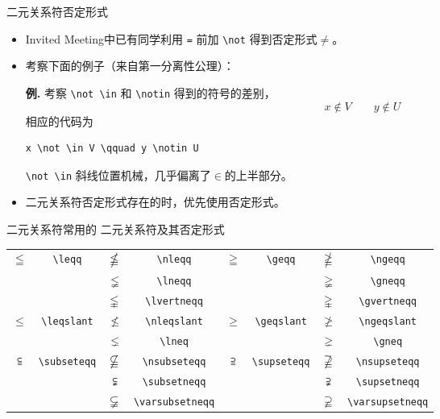 \documentclass[mathserif]{beamer}
\newcommand{\codegreen}[1]{\textcolor{codegreen}{#1}}
\newenvironment{instance}{\zihao{-5}\textbf{\songti \codegreen{例.}}}{\hfill\par}
\begin{document}
\begin{frame}[fragile]{二元关系符}{否定形式}
\begin{itemize}

\item Invited Meeting中已有同学利用 \lstinline'=' 前加 \lstinline'\not' 得到否定形式$\not =$。

\item 考察下面的例子（来自第一分离性公理）：

\begin{instance}
	考察 \lstinline'\not \in' 和 \lstinline'\notin' 得到的符号的差别，
\begin{equation*}
	x \not \in V \qquad y \notin U
\end{equation*}
相应的代码为
\begin{lstlisting}[numbers=none]
x \not \in V \qquad y \notin U
\end{lstlisting}
\lstinline'\not \in' 斜线位置机械，几乎偏离了$\in$的上半部分。
\end{instance}

\item 二元关系符否定形式存在的时，优先使用否定形式。

\end{itemize}
\end{frame}

\begin{frame}[fragile]{二元关系符}{常用的 \AmS{} 二元关系符及其否定形式}
\begin{table}[H]
\centering
\begin{tabular}{cc|cc|cc|cc}
	\toprule
	$\leqq$ & \lstinline'\leqq' & $\nleqq$ & \lstinline'\nleqq' & $\geqq$ & \lstinline'\geqq' & $\ngeqq$ & \lstinline'\ngeqq' \\
	~ & ~ & $\lneqq$ & \lstinline'\lneqq' & ~ & ~ & $\gneqq$ & \lstinline'\gneqq' \\
	~ & ~ & $\lvertneqq$ & \lstinline'\lvertneqq' & ~ & ~ & $\gvertneqq$ & \lstinline'\gvertneqq' \\
	$\leqslant$ & \lstinline'\leqslant' & $\nleqslant$ & \lstinline'\nleqslant' & $\geqslant$ & \lstinline'\geqslant' & $\ngeqslant$ & \lstinline'\ngeqslant' \\
	~ & ~ & $\lneq$ & \lstinline'\lneq' & ~ & ~ & $\gneq$ & \lstinline'\gneq' \\
	$\subseteqq$ & \lstinline'\subseteqq' & $\nsubseteqq$ & \lstinline'\nsubseteqq' & $\supseteqq$ & \lstinline'\supseteqq' & $\nsupseteqq$ & \lstinline'\nsupseteqq' \\
	~ & ~ & $\subsetneqq$ & \lstinline'\subsetneqq' & ~ & ~ & $\supsetneqq$ & \lstinline'\supsetneqq' \\
	~ & ~ & $\varsubsetneqq$ & \lstinline'\varsubsetneqq' & ~ & ~ & $\varsupsetneqq$ & \lstinline'\varsupsetneqq' \\
	\bottomrule
\end{tabular}
\end{table}
\end{frame}
\end{document}
